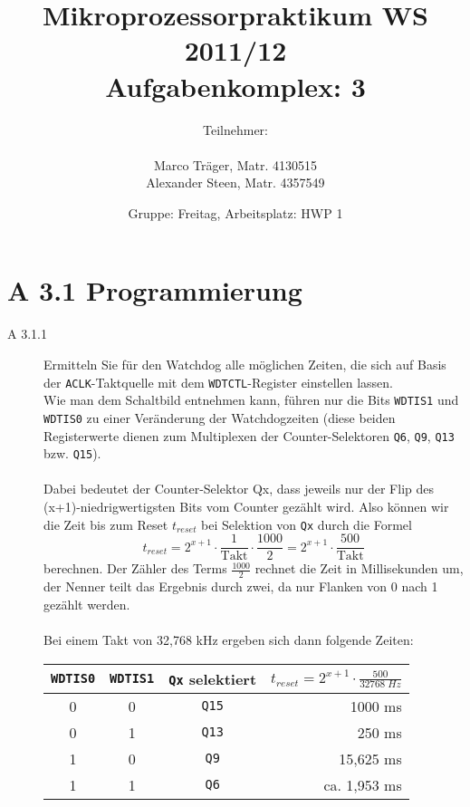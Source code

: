 \documentclass[11pt,a4paper,ngerman]{article}
\author{Teilnehmer:\\ \\Marco Träger, Matr. 4130515\\Alexander Steen, Matr. 4357549}
\date{Gruppe: Freitag, Arbeitsplatz: HWP 1}
\title{Mikroprozessorpraktikum WS 2011/12\\ Aufgabenkomplex: 3}
\begin{document}

\maketitle
\thispagestyle{fancy}
\newpage
\section*{A 3.1 Programmierung}

\begin{description}
	\item[A 3.1.1] Ermitteln Sie für den Watchdog alle möglichen Zeiten, die sich auf Basis der \texttt{ACLK}-Taktquelle mit dem \texttt{WDTCTL}-Register einstellen lassen. \\
	
	Wie man dem Schaltbild entnehmen kann, führen nur die Bits \texttt{WDTIS1} und \texttt{WDTIS0} zu einer Veränderung der Watchdogzeiten (diese beiden Registerwerte dienen zum Multiplexen der Counter-Selektoren \texttt{Q6}, \texttt{Q9}, \texttt{Q13} bzw. \texttt{Q15}).
	\\ \\
	Dabei bedeutet der Counter-Selektor Qx, dass jeweils nur der Flip des (x+1)-niedrigwertigsten Bits vom Counter gezählt wird.
	Also können wir die Zeit bis zum Reset $t_{reset}$ bei Selektion von \texttt{Qx} durch die Formel
	$$ 
		t_{reset} = 2^{x+1} \cdot  \frac{1}{\text{Takt}} \cdot \frac{1000}{2}
		=  2^{x+1} \cdot  \frac{500}{\text{Takt}}
	$$
	berechnen. Der Zähler des Terms $\frac{1000}{2}$ rechnet die Zeit in Millisekunden um, der Nenner teilt das Ergebnis durch zwei, da nur Flanken von 0 nach 1 gezählt werden. \\ \\
	
	Bei einem Takt von 32,768 kHz ergeben sich dann folgende Zeiten:
	
	\begin{tabular}{c|c|c|r}
	\texttt{WDTIS0} & \texttt{WDTIS1} & \texttt{Qx} selektiert & $t_{reset} = 2^{x+1} \cdot \frac{500}{32768 \; Hz}$ \\ 
	\hline \hline
	0 & 0 & \texttt{Q15} & 1000 ms \\
	0 & 1 & \texttt{Q13} & 250 ms \\
	1 & 0 & \texttt{Q9} & 15,625 ms \\
	1 & 1 & \texttt{Q6} & ca. 1,953 ms \\
	\end{tabular}
	

\end{description}
\end{document}
